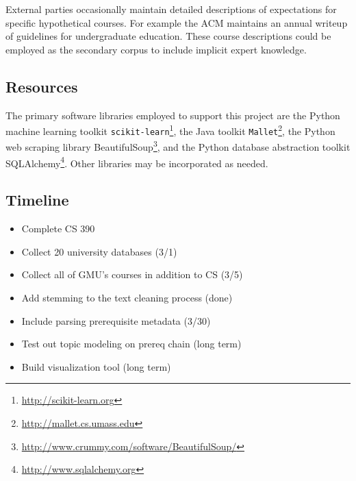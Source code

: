 External parties occasionally maintain detailed descriptions of
expectations for specific hypothetical courses. For example the ACM
maintains an annual writeup of guidelines for undergraduate education.
\cite{CS2013} These course descriptions could be employed as the secondary
corpus to include implicit expert knowledge.


\subsection{Resources}

The primary software libraries employed to support this project are the
Python machine learning toolkit
\texttt{scikit-learn}\footnote{\url{http://scikit-learn.org}}, the Java
toolkit \texttt{Mallet}\footnote{\url{http://mallet.cs.umass.edu}}, the
Python web scraping library
BeautifulSoup\footnote{\url{http://www.crummy.com/software/BeautifulSoup/}},
and the Python database abstraction toolkit
SQLAlchemy\footnote{\url{http://www.sqlalchemy.org}}.
Other libraries may be incorporated as needed.


\subsection{Timeline}

\begin{itemize}
  \item {\color{green}Complete CS 390}
  \item {\color{yellow}Collect 20 university databases (3/1)}
  \item Collect all of GMU's courses in addition to CS (3/5)
  \item {\color{green}Add stemming to the text cleaning process (done)}
  \item Include parsing prerequisite metadata (3/30)
  \item Test out topic modeling on prereq chain (long term)
  \item Build visualization tool (long term)
\end{itemize}

